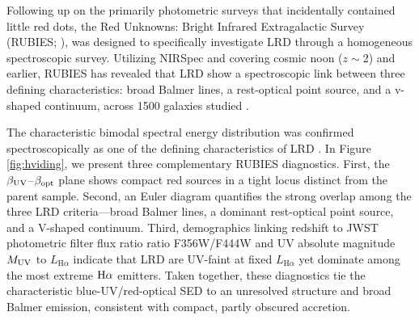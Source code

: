 \documentclass[utf8]{FrontiersinHarvard} %
\begin{document}

Following up on the primarily photometric surveys that incidentally contained little red dots, the Red Unknowns: Bright Infrared Extragalactic Survey (RUBIES; \citealt{de2025rubies}), was designed to specifically investigate LRD through a homogeneous spectroscopic survey. Utilizing NIRSpec and covering cosmic noon ($z \sim$2) and earlier, RUBIES has revealed that LRD show a spectroscopic link between three defining characteristics: broad Balmer lines, a rest-optical point source, and a v-shaped continuum, across 1500 galaxies studied \citep{hviding2025rubies}.

The characteristic bimodal spectral energy distribution was confirmed spectroscopically as one of the defining characteristics of LRD \citep{hviding2025rubies}. In Figure \ref{fig:hviding}, we present three complementary RUBIES diagnostics. First, the $\beta_{\rm UV}$–$\beta_{\rm opt}$ plane shows compact red sources in a tight locus distinct from the parent sample. Second, an Euler diagram quantifies the strong overlap among the three LRD criteria—broad Balmer lines, a dominant rest-optical point source, and a V-shaped continuum. Third, demographics linking redshift to JWST photometric filter flux ratio ratio F356W/F444W and UV absolute magnitude $M_{\rm UV}$ to $L_{\mathrm{H}\alpha}$ indicate that LRD are UV-faint at fixed $L_{\mathrm{H}\alpha}$ yet dominate among the most extreme ${\rm H}\alpha$ emitters. Taken together, these diagnostics tie the characteristic blue-UV/red-optical SED to an unresolved structure and broad Balmer emission, consistent with compact, partly obscured accretion.


\end{document}

